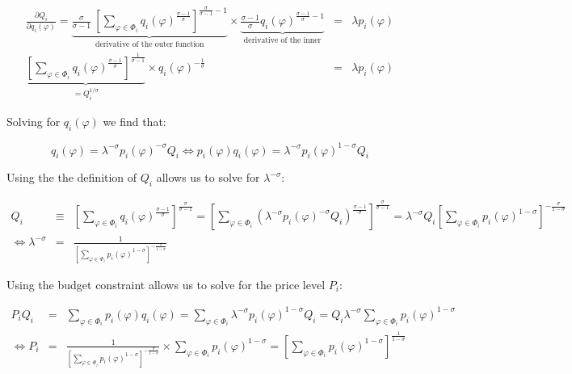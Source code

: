 \documentclass[11pt,letterpaper]{article}
\begin{document}
\begin{eqnarray*}
    \frac{\partial Q_i}{\partial q_{i}(\varphi)} = \underbrace{\frac{\sigma}{\sigma-1} \ \left[ \sum_{\varphi \in \Phi_i } q_i(
\varphi)^{\tfrac{\sigma-1}{\sigma}} \right]^{\tfrac{\sigma}{\sigma-1} -1}}_{\text{derivative of the outer function}} \times \underbrace{\frac{\sigma-1}{\sigma}   q_i(
\varphi)^{\tfrac{\sigma-1}{\sigma}-1}}_{\text{derivative of the inner}} &=& \lambda p_i(\varphi) \\
\underbrace{\left[ \sum_{\varphi \in \Phi_i } q_i(
\varphi)^{\tfrac{\sigma-1}{\sigma}} \right]^{\tfrac{1}{\sigma-1}}}_{=Q_i^{1/\sigma}} \times  q_i(
\varphi)^{-\tfrac{1}{\sigma}} &=& \lambda p_i(\varphi) 
\end{eqnarray*}

Solving for $q_i(\varphi)$ we find that:

\begin{equation*}
\boxed{
    q_i(
\varphi) = \lambda^{-\sigma} p_i(\varphi)^{-\sigma} Q_i \iff p_i(\varphi) q_i(
\varphi) = \lambda^{-\sigma} p_i(\varphi)^{1-\sigma} Q_i
}
\end{equation*}

Using the the definition of $Q_i$ allows us to solve for $\lambda^{-\sigma}$:

\begin{eqnarray*}
     Q_i &\equiv& \left[ \sum_{\varphi \in \Phi_i } q_i(
\varphi)^{\tfrac{\sigma-1}{\sigma}} \right]^{\tfrac{\sigma}{\sigma-1} }  = \left[ \sum_{\varphi \in \Phi_i } \left( \lambda^{-\sigma} p_i(\varphi)^{-\sigma} Q_i \right)^{\tfrac{\sigma-1}{\sigma}} \right]^{\tfrac{\sigma}{\sigma-1} } = \lambda^{-\sigma}  Q_i \left[ \sum_{\varphi \in \Phi_i }  p_i(\varphi) ^{1-\sigma} \right]^{-\tfrac{\sigma}{1-\sigma} } \\
\iff \lambda^{-\sigma} &=& \frac{1}{\left[ \sum_{\varphi \in \Phi_i }  p_i(\varphi) ^{1-\sigma} \right]^{-\tfrac{\sigma}{1-\sigma}} } 
\end{eqnarray*}

Using the budget constraint allows us to solve for the price level $P_i$:

\begin{eqnarray*}
    P_i Q_i &=& \sum_{\varphi \in \Phi_i } p_i(\varphi) q_i(\varphi) = \sum_{\varphi \in \Phi_i } \lambda^{-\sigma} p_i(\varphi)^{1-\sigma} Q_i = Q_i  \lambda^{-\sigma} \sum_{\varphi \in \Phi_i }  p_i(\varphi)^{1-\sigma} \\
    \iff P_i &=& \frac{1}{\left[ \sum_{\varphi \in \Phi_i }  p_i(\varphi) ^{1-\sigma} \right]^{-\tfrac{\sigma}{1-\sigma} }} \times  \sum_{\varphi \in \Phi_i }  p_i(\varphi)^{1-\sigma} = \left[ \sum_{\varphi \in \Phi_i }  p_i(\varphi) ^{1-\sigma} \right]^{\tfrac{1}{1-\sigma}} 
\end{eqnarray*}
\end{document}
